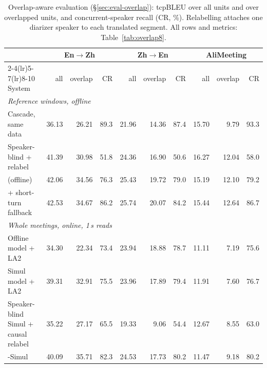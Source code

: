 \begin{table}[t]
\centering\small
\setlength{\tabcolsep}{4pt}
\begin{tabular}{lrrrrrrrrr}
\toprule
 & \multicolumn{3}{c}{En$\rightarrow$Zh} & \multicolumn{3}{c}{Zh$\rightarrow$En} & \multicolumn{3}{c}{AliMeeting} \\
\cmidrule(lr){2-4}\cmidrule(lr){5-7}\cmidrule(lr){8-10}
System & all & overlap & CR & all & overlap & CR & all & overlap & CR \\
\midrule
\multicolumn{10}{l}{\emph{Reference windows, offline}} \\
Cascade, same data & 36.13 & 26.21 & 89.3 & 21.96 & 14.36 & 87.4 & 15.70 & 9.79 & 93.3 \\
Speaker-blind + relabel & 41.39 & 30.98 & 51.8 & 24.36 & 16.90 & 50.6 & 16.27 & 12.04 & 58.0 \\
\sys{} (offline) & 42.06 & 34.56 & 76.3 & 25.43 & 19.72 & 79.0 & 15.19 & 12.10 & 79.2 \\
\quad + short-turn fallback & 42.53 & 34.67 & 86.2 & 25.74 & 20.07 & 84.2 & 15.44 & 12.64 & 86.7 \\
\multicolumn{10}{l}{\emph{Whole meetings, online, 1\,s reads}} \\
Offline model + LA2 & 34.30 & 22.34 & 73.4 & 23.94 & 18.88 & 78.7 & 11.11 & 7.19 & 75.6 \\
Simul model + LA2 & 39.31 & 32.91 & 75.5 & 23.96 & 17.89 & 79.4 & 11.91 & 7.60 & 76.7 \\
Speaker-blind Simul + causal relabel & 35.22 & 27.17 & 65.5 & 19.33 & 9.06 & 54.4 & 12.67 & 8.55 & 63.0 \\
\sys{}-Simul & 40.09 & 35.71 & 82.3 & 24.53 & 17.73 & 80.2 & 11.47 & 9.18 & 80.2 \\
\bottomrule
\end{tabular}
\caption{Overlap-aware evaluation (\S\ref{sec:eval-overlap}): tcpBLEU over all units and over overlapped units, and
concurrent-speaker recall (CR, \%). Relabelling attaches one diarizer speaker to each translated segment. All rows and
metrics: Table~\ref{tab:overlap8}.}
\label{tab:ovmain8}
\end{table}
